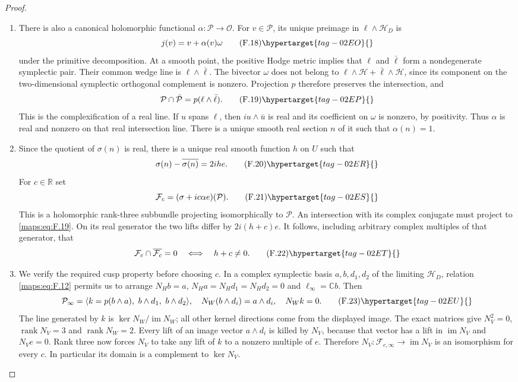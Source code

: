 \begin{proof}
\begin{enumerate}[label={$\langle1\rangle$\arabic*.}]
\item There is also a canonical holomorphic functional
$\alpha:\mathcal P\to\mathcal O$.
For $v\in\mathcal P$, its unique preimage in
$\ell\wedge\mathcal H_D$ is
\[
 j(v)=v+\alpha(v)\omega
 \tag{F.18}\hypertarget{tag-02EO}{}\label{maps:eq:F.18}
\]
under the primitive decomposition.
At a smooth point, the positive Hodge metric implies that
$\ell$ and $\bar\ell$ form a nondegenerate symplectic pair.
Their common wedge line is $\ell\wedge\bar\ell$.
The bivector $\omega$ does not belong to
$\ell\wedge\mathcal H+\bar\ell\wedge\mathcal H$, since its
component on the two-dimensional symplectic orthogonal complement
is nonzero.  Projection $p$ therefore preserves the intersection,
and
\[
 \mathcal P\cap\bar{\mathcal P}
      =p(\ell\wedge\bar\ell).
 \tag{F.19}\hypertarget{tag-02EP}{}\label{maps:eq:F.19}
\]
This is the complexification of a real line.  If $u$ spans
$\ell$, then $i u\wedge\bar u$ is real and its coefficient on
$\omega$ is nonzero, by positivity.  Thus $\alpha$ is real and
nonzero on that real intersection line.  There is a unique smooth
real section $n$ of it such that $\alpha(n)=1$.

\item Since the quotient of $\sigma(n)$ is real, there is a unique
real smooth function $h$ on $U$ such that
\[
 \sigma(n)-\overline{\sigma(n)}=2ih e.
 \tag{F.20}\hypertarget{tag-02ER}{}\label{maps:eq:F.20}
\]
For $c\in\mathbb R$ set
\[
 \mathcal F_c=(\sigma+ic\alpha e)(\mathcal P).
 \tag{F.21}\hypertarget{tag-02ES}{}\label{maps:eq:F.21}
\]
This is a holomorphic rank-three subbundle projecting
isomorphically to $\mathcal P$.  An intersection with its complex
conjugate must project to \eqref{maps:eq:F.19}.  On its real generator the two
lifts differ by $2i(h+c)e$.  It follows, including arbitrary
complex multiples of that generator, that
\[
 \mathcal F_c\cap\overline{\mathcal F_c}=0
       \quad\Longleftrightarrow\quad h+c\ne0.
 \tag{F.22}\hypertarget{tag-02ET}{}\label{maps:eq:F.22}
\]

\item We verify the required cusp property before choosing $c$.
In a complex symplectic basis $a,b,d_1,d_2$ of the limiting
$\mathcal H_D$, relation \eqref{maps:eq:F.12} permits us to arrange
$N_Hb=a$, $N_Ha=N_Hd_1=N_Hd_2=0$ and $\ell_\infty=\mathbb Cb$.
Then
\[
 \mathcal P_\infty=
 \langle k=p(b\wedge a),\ b\wedge d_1,\ b\wedge d_2\rangle,
 \quad
 N_W(b\wedge d_i)=a\wedge d_i,
 \quad N_Wk=0.
 \tag{F.23}\hypertarget{tag-02EU}{}\label{maps:eq:F.23}
\]
The line generated by $k$ is
$\ker N_W/\operatorname{im}N_W$; all other kernel directions
come from the displayed image.  The exact matrices give
$N_V^2=0$, $\operatorname{rank}N_V=3$ and
$\operatorname{rank}N_W=2$.
Every lift of an image vector $a\wedge d_i$ is killed by $N_V$,
because that vector has a lift in $\operatorname{im}N_V$ and
$N_Ve=0$.  Rank three now forces $N_V$ to take any lift of $k$
to a nonzero multiple of $e$.  Therefore
$N_V:\mathcal F_{c,\infty}\to\operatorname{im}N_V$ is an
isomorphism for every $c$.  In particular its domain is a
complement to $\ker N_V$.


\end{enumerate}
\end{proof}
